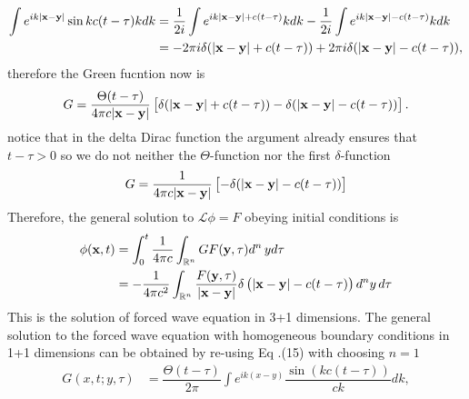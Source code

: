 \documentclass{article}
\newcommand{\f}[2]{\dfrac{#1}{#2}}
\begin{document}
\begin{equation}
	\begin{aligned}
		\int e^{ i k \abs{\mathbf{x} - \mathbf{y}}} \sin kc(t - \tau) k  dk 
		&= \f{1}{2i} \int e^{ik \abs{\mathbf{x - y}} + c(t -\tau)} k dk  - \f{1}{2i} \int e^{ik \abs{\mathbf{x - y}} - c(t - \tau)} k dk\\
		&= -2 \pi i \delta( \abs{\mathbf{x - y}} + c (t - \tau)) + 2 \pi i \delta( \abs{\mathbf{x - y}} - c (t - \tau)),
	\end{aligned}
\end{equation}
therefore the Green fucntion now is
\begin{equation}
	\begin{aligned}
		G 
		&=   \f{\Theta (t - \tau)}{4\pi c \abs{\mathbf{x - y}}} \left[ \delta( \abs{\mathbf{x - y}} + c(t - \tau)) - \delta( \abs{\mathbf{x - y}} - c(t - \tau)) \right].\\
	\end{aligned}
\end{equation}
notice that in the delta Dirac function the argument already ensures that $t - \tau > 0$ so we do not neither the $\Theta$-function nor the first $\delta$-function
\begin{gather}
	G = \f{1}{4\pi c \abs{\mathbf{x - y}}} \left[ - \delta( \abs{\mathbf{x - y}} - c(t - \tau)) \right]
\end{gather}
Therefore, the general solution to $\mathcal{L} \phi = F$	obeying initial conditions is
\begin{equation}
	\begin{aligned}
		\phi(\mathbf{x},t) 
		&= \int_{0}^{t} \f{1}{4\pi c} \int_{\mathbb{R}^{n}} G F(\mathbf{y},\tau) d^{n}\, y d\tau \\
		&= -\f{1}{4 \pi c^{2}} \int_{\mathbb{R}^{n}} \f{F(\mathbf{y},\tau)}{\abs{\mathbf{x - y}}} \delta\left( \abs{\mathbf{x - y}} - c(t - \tau) \right) d^{n}y\, d\tau
	\end{aligned}
\end{equation}
This is the solution of forced wave equation in 3+1 dimensions. The general solution to the forced wave equation with homogeneous boundary conditions in 1+1 dimensions can be obtained by re-using Eq .(15) with choosing $n = 1$
\begin{equation}
	\begin{aligned}
		G(x,t;y,\tau)
		& = \f{\Theta(t - \tau)}{2\pi} \int e^{ik(x-y)} \f{\sin( kc (t - \tau))}{ck} dk,
	\end{aligned}
\end{equation}
\end{document}
